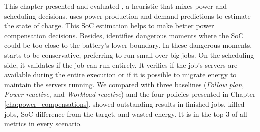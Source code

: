 This chapter presented and evaluated \emph{\systemName}, a heuristic that mixes power and scheduling decisions. \emph{\systemName} uses power production and demand predictions to estimate the state of charge. This SoC estimation helps to make better power compensation decisions. Besides, \emph{\systemName} identifies dangerous moments where the SoC could be too close to the battery's lower boundary. In these dangerous moments, \emph{\systemName} starts to be conservative, preferring to run small over big jobs. On the scheduling side, it validates if the job can run entirely. It verifies if the job's servers are available during the entire execution or if it is possible to migrate energy to maintain the servers running. We compared \emph{\systemName} with three baselines (\emph{Follow plan}, \emph{Power reactive}, and \emph{Workload reactive}) and the four policies presented in Chapter \ref{cha:power_compensations}. \emph{\systemName} showed outstanding results in finished jobs, killed jobs, SoC difference from the target, and wasted energy. It is in the top 3 of all metrics in every scenario. 